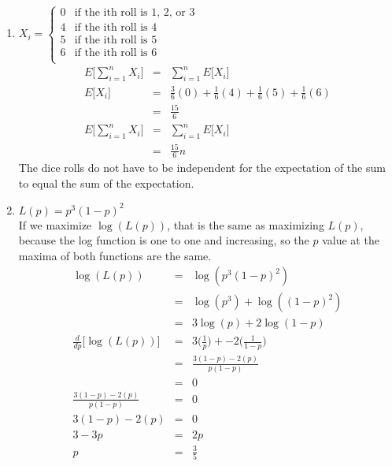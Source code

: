 \documentclass[12pt]{article}
\begin{document}
\begin{enumerate}[label=(\alph*)]
  \item
  $X_i = \left \{
     \begin{array}{ll}
       0 & \mbox{if the ith roll is 1, 2, or 3}\\
       4 & \mbox{if the ith roll is 4}\\
       5 & \mbox{if the ith roll is 5}\\
       6 & \mbox{if the ith roll is 6}\\
     \end{array}
   \right.
   $
  \begin{eqnarray*}
  E\biggl[\displaystyle\sum\limits_{i=1}^n X_i\biggr] &=& \displaystyle\sum\limits_{i=1}^n E\biggl[X_i\biggr]\\
  E\biggl[X_i\biggr] &=& \frac{3}{6} (0) + \frac{1}{6} (4) + \frac{1}{6} (5) + \frac{1}{6} (6) \\
  &=& \frac{15}{6}\\
  E\biggl[\displaystyle\sum\limits_{i=1}^n X_i\biggr] &=& \displaystyle\sum\limits_{i=1}^n E\biggl[X_i\biggr]\\
  &=& \frac{15}{6} n
  \end{eqnarray*}
  The dice rolls do not have to be independent for the expectation of the sum to equal the sum of the expectation.

  \item
  $L(p) = p^3(1-p)^2$\\
  If we maximize $\log(L(p))$, that is the same as maximizing $L(p)$, because the log function is one to one and increasing, so the $p$ value at the maxima of both functions are the same.
  \begin{eqnarray*}
  \log(L(p)) &=& \log(p^3(1-p)^2)\\
  &=& \log(p^3) + \log((1-p)^2)\\
  &=& 3\log(p) + 2\log(1-p)\\
  \frac{d}{dp}\biggl[\log(L(p))\biggr] &=& 3\biggl(\frac{1}{p}\biggr) + -2\biggl(\frac{1}{1-p}\biggr)\\
  &=& \frac{3(1-p) - 2(p)}{p(1-p)}\\
  &=& 0\\
  \frac{3(1-p) - 2(p)}{p(1-p)} &=& 0\\
  3(1-p) - 2(p) &=& 0\\
  3 - 3p &=& 2p\\
  p &=& \frac{3}{5}\\
  \end{eqnarray*}

\end{enumerate}
\end{document}
